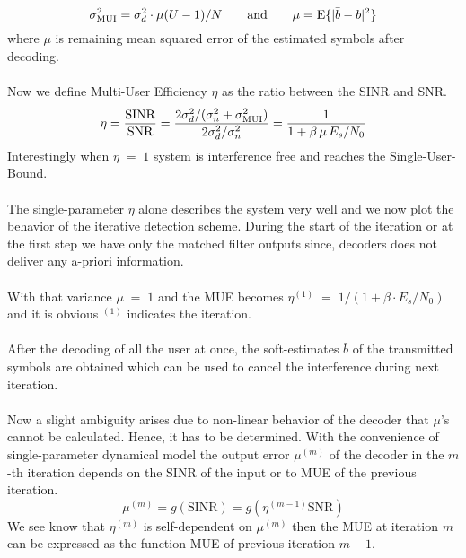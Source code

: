 \begin{equation}
\sigma_{\mathrm{MUI}}^2=\sigma_d^2\cdot \mu(U-1)/N\hspace{7mm}\mathrm{and}\hspace{7mm}\mu=\mathrm{E}\{\vert\bar{b}-b\vert^2\}
\end{equation}
where $\mu$ is remaining mean squared error of the estimated symbols after decoding.\\ \\
Now we define Multi-User Efficiency $\eta$ as the ratio between the SINR and SNR.
\begin{equation}
\eta=\frac{\hbox{$\mathrm{SINR}$}}{\hbox{$\mathrm{SNR}$}}=\frac{\hbox{$2\sigma_d^2/(\sigma_n^2+\sigma_{\textrm{MUI}}^2)$}}{\hbox{$2\sigma_d^2/\sigma_n^2$}}=\frac{\hbox{$1$}}{\hbox{$1+\beta\,\mu\,E_s/N_0$}}
\end{equation}
Interestingly when $\eta\;=\;1$ system is interference free and reaches the Single-User-Bound. \\ \\
The single-parameter $\eta$ alone describes the system very well and we now plot the behavior of the iterative detection scheme. During the start of the iteration or at the first step we have only the matched filter outputs since, decoders does not deliver any a-priori information. \\ \\
With that variance $\mu\;=\;1$ and the MUE becomes $\eta^{(1)}\;=\;1/(1+\beta\cdot E_s/N_0)$ and it is obvious $^{(1)}$ indicates the iteration.\\ \\
After the decoding of all the user at once, the soft-estimates $\bar{b}$ of the transmitted symbols are obtained which can be used to cancel the interference during next iteration. \\ \\
Now a slight ambiguity arises due to non-linear behavior of the decoder that $\mu$'s cannot be calculated. Hence, it has to be determined. With the convenience of single-parameter dynamical model the output error $\mu^{(m)}$ of the decoder in the $m$-th iteration depends on the SINR of the input or to MUE of the previous iteration.
\begin{equation}
\mu^{(m)}=g(\mathrm{SINR})=g\left(\eta^{(m-1)}\mathrm{SNR}\right)
\end{equation}
We see know that $\eta^{(m)}$ is self-dependent on $\mu^{(m)}$ then the MUE at iteration $m$ can be expressed as the function MUE of previous iteration $m-1$. \\ \\

